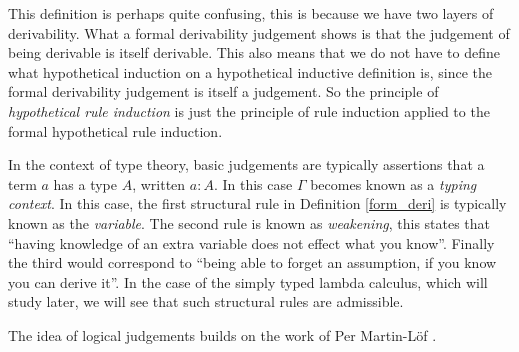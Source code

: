 \begin{remark}
    This definition is perhaps quite confusing, this is because we have two layers of derivability. What a formal derivability judgement shows is that the judgement of being derivable is itself derivable. This also means that we do not have to define what hypothetical induction on a hypothetical inductive definition is, since the formal derivability judgement is itself a judgement. So the principle of \emph{hypothetical rule induction} is just the principle of rule induction applied to the formal hypothetical rule induction.
\end{remark}

\begin{remark}\label{structural_remark}
    In the context of type theory, basic judgements are typically assertions that a term $a$ has a type $A$, written $a : A$. In this case $\Gamma$ becomes known as a \emph{typing context}. In this case, the first structural rule in Definition \ref{form_deri} is typically known as the \emph{variable}.
    The second rule is known as \emph{weakening}, this states that ``having knowledge of an extra variable does not effect what you know''. Finally the third would correspond to ``being able to forget an assumption, if you know you can derive it''. In the case of the simply typed lambda calculus, which will study later, we will see that such structural rules are admissible. 
\end{remark}

The idea of logical judgements builds on the work of Per Martin-L\"of \cite{martin1996meanings, martin1984intuitionistic}.

